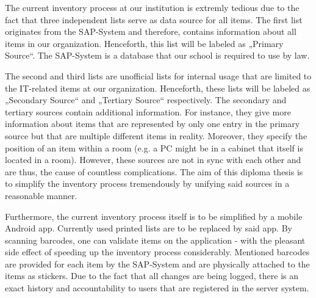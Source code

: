 The current inventory process at our institution is extremly tedious due to the fact that three independent lists serve as 
data source for all items. The first list originates from the SAP-System and therefore, contains information about all items in our organization.
Henceforth, this list will be labeled as „Primary Source“. The SAP-System is a database that our school is required to use by law. 

The second and third lists are unofficial lists for internal usage that are limited to the IT-related items at our organization. 
Henceforth, these lists will be labeled as „Secondary Source“ and „Tertiary Source“ respectively.
The secondary and tertiary sources contain additional information. For instance, they give more information about items that are represented by only one entry in the primary source but that are multiple different items in reality. Moreover, they specify the position of an item within a room (e.g. a PC might be in a cabinet that itself is located in a room).
However, these sources are not in sync with each other and are thus, the cause 
of countless complications. The aim of this diploma thesis is to simplify the inventory process tremendously by unifying said sources in a reasonable manner.

Furthermore, the current inventory process itself is to be simplified by a mobile Android app. Currently used printed lists are to be replaced 
by said app. By scanning barcodes, one can validate items on the application - with the pleasant side effect of speeding up the inventory process
considerably. Mentioned barcodes are provided for each item by the SAP-System and are physically attached to the items as stickers. 
Due to the fact that all changes are being logged, there is an exact history and accountability to users that are registered in the server system.